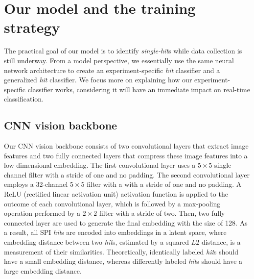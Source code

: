 




















\section{Our model and the training strategy}

The practical goal of our model is to identify \textit{single-hit}s while data
collection is still underway.  From a model perspective, we essentially use the
same neural network architecture to create an experiment-specific \textit{hit} classifier
and a generalized \textit{hit} classifier.  We focus more on explaining how our
experiment-specific classifier works, considering it will have an immediate
impact on real-time classification.  


\subsection{CNN vision backbone}

Our CNN vision backbone consists of two convolutional layers that extract image
features and two fully connected layers that compress these image features into
a low dimensional embedding.  The first convolutional layer uses a $5 \times 5$
single channel filter with a stride of one and no padding.  The second
convolutional layer employs a 32-channel $5 \times 5$ filter with a with a
stride of one and no padding.  A ReLU (rectified linear activation unit)
activation function is applied to the outcome of each convolutional layer, which
is followed by a max-pooling operation performed by a $2\times 2$ filter with a
stride of two.  Then, two fully connected layer are used to generate the final
embedding with the size of 128.  As a result, all SPI \textit{hit}s are encoded
into embeddings in a latent space, where embedding distance between two
\textit{hit}s, estimated by a squared $L2$ distance, is a measurement of their
similarities.  Theoretically, identically labeled \textit{hit}s should have a
small embedding distance, whereas differently labeled \textit{hit}s should have
a large embedding distance.  


